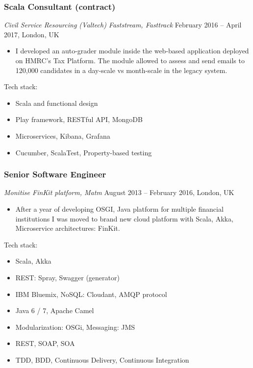 \documentclass[]{rss}
\providecommand{\tightlist}{%
  \setlength{\itemsep}{0pt}\setlength{\parskip}{0pt}}
\begin{document}
\begin{resume}
\hypertarget{scala-consultant-contract}{%
\subsubsection{Scala Consultant
(contract)}\label{scala-consultant-contract}}

\emph{Civil Service Resourcing (Valtech) \textbar{} Faststream,
Fasttrack} February 2016 -- April 2017, London, UK

\begin{itemize}
\tightlist
\item
  I developed an auto-grader module inside the web-based application
  deployed on HMRC's Tax Platform. The module allowed to assess and send
  emails to 120,000 candidates in a day-scale vs month-scale in the
  legacy system.
\end{itemize}

Tech stack:

\begin{itemize}
\tightlist
\item
  Scala and functional design
\item
  Play framework, RESTful API, MongoDB
\item
  Microservices, Kibana, Grafana
\item
  Cucumber, ScalaTest, Property-based testing
\end{itemize}

\hypertarget{senior-software-engineer}{%
\subsubsection{Senior Software
Engineer}\label{senior-software-engineer}}

\emph{Monitise \textbar{} FinKit platform, Matm} August 2013 -- February
2016, London, UK

\begin{itemize}
\tightlist
\item
  After a year of developing OSGI, Java platform for multiple financial
  institutions I was moved to brand new cloud platform with Scala, Akka,
  Microservice architectures: FinKit.
\end{itemize}

Tech stack:

\begin{itemize}
\tightlist
\item
  Scala, Akka
\item
  REST: Spray, Swagger (generator)
\item
  IBM Bluemix, NoSQL: Cloudant, AMQP protocol
\item
  Java 6 / 7, Apache Camel
\item
  Modularization: OSGi, Messaging: JMS
\item
  REST, SOAP, SOA
\item
  TDD, BDD, Continuous Delivery, Continuous Integration
\end{itemize}


\end{resume}
\end{document}
